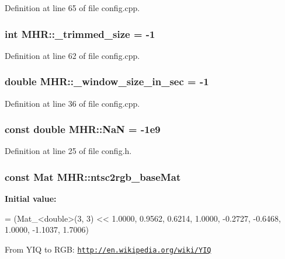 Definition at line 65 of file config.\+cpp.

\hypertarget{namespace_m_h_r_a87eb7e22893e5160d4a98344bc8bdff4}{
\subsubsection[{\+\_\+trimmed\+\_\+size}]{\setlength{\rightskip}{0pt plus 5cm}int M\+H\+R\+::\+\_\+trimmed\+\_\+size = -\/1}}\label{namespace_m_h_r_a87eb7e22893e5160d4a98344bc8bdff4}


Definition at line 62 of file config.\+cpp.

\hypertarget{namespace_m_h_r_a9732a5bb1cbdb99030149ae2bb1cae69}{
\subsubsection[{\+\_\+window\+\_\+size\+\_\+in\+\_\+sec}]{\setlength{\rightskip}{0pt plus 5cm}double M\+H\+R\+::\+\_\+window\+\_\+size\+\_\+in\+\_\+sec = -\/1}}\label{namespace_m_h_r_a9732a5bb1cbdb99030149ae2bb1cae69}


Definition at line 36 of file config.\+cpp.

\hypertarget{namespace_m_h_r_a1f2bac57e6ccaebc6afd932278b163ec}{
\subsubsection[{Na\+N}]{\setlength{\rightskip}{0pt plus 5cm}const double M\+H\+R\+::\+Na\+N = -\/1e9}}\label{namespace_m_h_r_a1f2bac57e6ccaebc6afd932278b163ec}


Definition at line 25 of file config.\+h.

\hypertarget{namespace_m_h_r_a1ab4a7e6b45362de2827fd373b53ba24}{
\subsubsection[{ntsc2rgb\+\_\+base\+Mat}]{\setlength{\rightskip}{0pt plus 5cm}const Mat M\+H\+R\+::ntsc2rgb\+\_\+base\+Mat}}\label{namespace_m_h_r_a1ab4a7e6b45362de2827fd373b53ba24}
{\bfseries Initial value\+:}
\begin{DoxyCode}
= (Mat\_<double>(3, 3) <<
                                  1.0000, 0.9562, 0.6214,
                                  1.0000, -0.2727, -0.6468,
                                  1.0000, -1.1037, 1.7006)
\end{DoxyCode}
From Y\+I\+Q to R\+G\+B\+:  \href{http://en.wikipedia.org/wiki/YIQ}{\tt http\+://en.\+wikipedia.\+org/wiki/\+Y\+I\+Q} 

